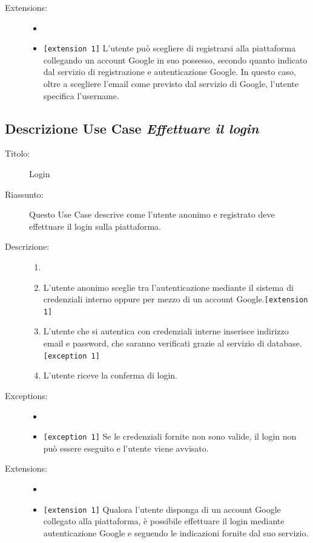 \documentclass[11pt, a4paper]{article}
\theoremstyle{definition} %
\begin{document}
\begin{description}
    \item[Extensions:]
    \begin{itemize}
        \item[]
        \item \texttt{[extension 1]} L'utente può scegliere di registrarsi alla piattaforma collegando un account Google in suo possesso, secondo quanto indicato dal servizio di registrazione e autenticazione Google.
        In questo caso, oltre a scegliere l'email come previsto dal servizio di Google, l'utente specifica l'username.
    \end{itemize}
\end{description}

\newpage
\subsection*{Descrizione Use Case \textit{Effettuare il login}}
\begin{description}
    \item[Titolo:] Login
    
    \item[Riassunto:] Questo Use Case descrive come l'utente anonimo e registrato deve
    effettuare il login sulla piattaforma.

    \item[Descrizione:]
    \begin{enumerate}
        \item[]
        \item L'utente anonimo sceglie tra l'autenticazione mediante il sistema di credenziali interno oppure per mezzo di un account Google.\texttt{[extension 1]}
        \item L'utente che si autentica con credenziali interne inserisce indirizzo email e password, che saranno verificati grazie al servizio di database.\texttt{[exception 1]}
        \item L'utente riceve la conferma di login.
    \end{enumerate}
    
    \item[Exceptions:]
    \begin{itemize}
        \item[]
        \item \verb|[exception 1]| Se le credenziali fornite non sono valide, il login non può essere eseguito e l'utente viene avvisato.
    \end{itemize}

    \item[Extensions:]
    \begin{itemize}
        \item[]
        \item \texttt{[extension 1]} Qualora l'utente disponga di un account Google collegato alla piattaforma, è possibile effettuare il login
        mediante autenticazione Google e seguendo le indicazioni fornite dal suo servizio.
    \end{itemize}
\end{description}
\end{document}
